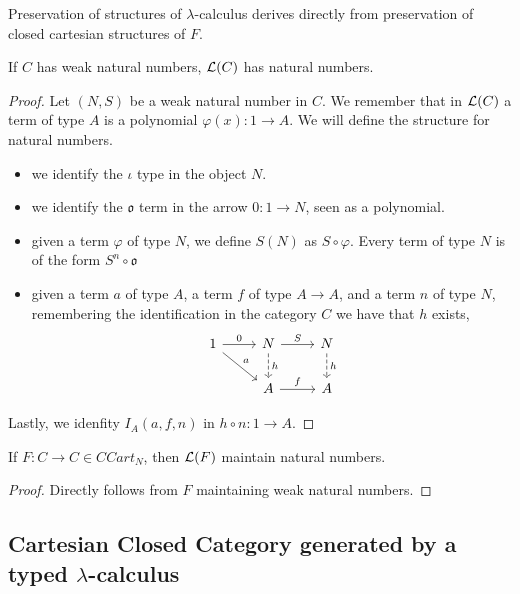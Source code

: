 \begin{remark}
  Preservation of structures of $\lambda$-calculus derives directly from preservation of closed cartesian structures of $F$.
\end{remark}

\begin{proposition}\label{natural-numbers}
  If $C$ has weak natural numbers, $\mathcal{L} (C)$ has natural numbers. 
\end{proposition}
\begin{proof}
  Let $(N,S)$ be a weak natural number in $C$. We remember that in $\mathcal{L}(C)$ a term of type $A$ is a polynomial $\varphi(x): 1 \to A$. We will define the structure for natural numbers.
  \begin{itemize}
  \item we identify the $\iota$ type in the object $N$.
  \item we identify the $\mathfrak{o}$ term in the arrow $0: 1 \to N$, seen as a polynomial.
  \item given a term $\varphi$ of type $N$, we define $S(N)$ as $S\circ\varphi$. Every term of type $N$ is of the form $S^n\circ \mathfrak o$
  \item given a term $a$ of type $A$, a term $f$ of type $A\to A$, and a term $n$  of type $N$, remembering the identification in the category $C$ we have that $h$ exists,
    \[
      \begin{tikzcd}
        1\arrow{dr}{a}\arrow{r}{0} & N\arrow{r}{S}\arrow[dashed]{d}{h} & N\arrow[dashed]{d}{h}\\
        & A\arrow{r}{f} & A
      \end{tikzcd}
    \]
  \end{itemize}

  Lastly, we idenfity $I_A(a,f,n)$ in $h\circ n: 1 \to A$.
  
\end{proof}

\begin{proposition}
  If $F: C\to C \in CCart_N$, then $\mathcal{L} (F)$ maintain natural numbers.
\end{proposition}

\begin{proof}
  Directly follows from $F$ maintaining weak natural numbers. 
\end{proof}

\subsection{Cartesian Closed Category generated by a typed $\lambda$-calculus}

